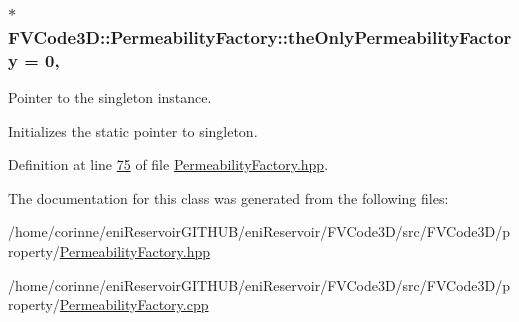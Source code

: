 \subsubsection[{\texorpdfstring{the\+Only\+Permeability\+Factory}{theOnlyPermeabilityFactory}}]{ $\ast$ F\+V\+Code3\+D\+::\+Permeability\+Factory\+::the\+Only\+Permeability\+Factory = 0\hspace{0.3cm}{\ttfamily [static]}, {\ttfamily [private]}}\hypertarget{classFVCode3D_1_1PermeabilityFactory_af47631ea4362556dd4240314e5e056b7}{}\label{classFVCode3D_1_1PermeabilityFactory_af47631ea4362556dd4240314e5e056b7}


Pointer to the singleton instance. 

Initializes the static pointer to singleton. 

Definition at line \hyperlink{PermeabilityFactory_8hpp_source_l00075}{75} of file \hyperlink{PermeabilityFactory_8hpp_source}{Permeability\+Factory.\+hpp}.



The documentation for this class was generated from the following files\+:\begin{DoxyCompactItemize}
\item 
/home/corinne/eni\+Reservoir\+G\+I\+T\+H\+U\+B/eni\+Reservoir/\+F\+V\+Code3\+D/src/\+F\+V\+Code3\+D/property/\hyperlink{PermeabilityFactory_8hpp}{Permeability\+Factory.\+hpp}\item 
/home/corinne/eni\+Reservoir\+G\+I\+T\+H\+U\+B/eni\+Reservoir/\+F\+V\+Code3\+D/src/\+F\+V\+Code3\+D/property/\hyperlink{PermeabilityFactory_8cpp}{Permeability\+Factory.\+cpp}\end{DoxyCompactItemize}
